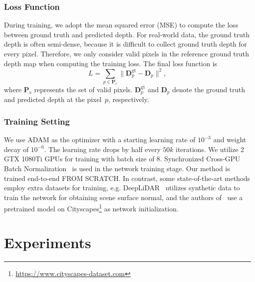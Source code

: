 \documentclass[journal]{IEEEtran}
\begin{document}
\subsubsection{Loss Function}
During training, we adopt the mean squared error (MSE) to compute the loss between ground truth and predicted depth.
For real-world data, the ground truth depth is often semi-dense, because it is difficult to collect ground truth depth for every pixel.
Therefore, we only consider valid pixels in the reference ground truth depth map when computing the training loss.
The final loss function is
\begin{equation} \label{eq:loss}
L = \sum_{p \in \mathbf{P}_{v}} \|\mathbf{D}_p^\mathrm{gt}-\mathbf{D}_p\|^{2},
\end{equation}
where \(\mathbf{P}_{v}\) represents the set of valid pixels.
$\mathbf{D}^\mathrm{gt}_p$ and $\mathbf{D}_p$ denote the ground truth and predicted depth at the pixel~$p$, respectively.

\subsubsection{Training Setting}
 We use ADAM\cite{adam} as the optimizer with a starting learning rate of $10^{-3}$ and weight decay of $10^{-6}$.
 The learning rate drops by half every $50k$ iterations.
 We utilize 2 GTX 1080Ti GPUs for training with batch size of 8.
 Synchronized Cross-GPU Batch Normalization~\cite{batch_norm,pytorch_encoding} is used in the network training stage.
 Our method is trained end-to-end FROM SCRATCH.
 In contrast, some state-of-the-art methods employ extra datasets for training,
 e.g. DeepLiDAR~\cite{deep_lidar} utilizes synthetic data to train the network for obtaining scene surface normal,
 and the authors of~\cite{sparse_noisy} use a pretrained model on Cityscapes\footnote{\url{https://www.cityscapes-dataset.com}} as network initialization.
 

\section{Experiments}
\end{document}
